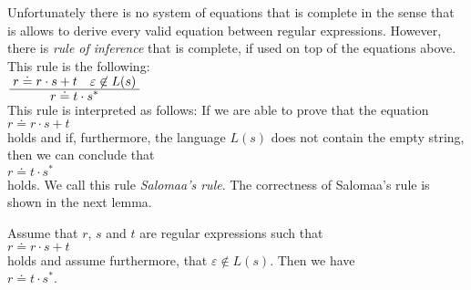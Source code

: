 Unfortunately there is no system of equations that is complete in the sense that is allows to derive
every valid equation between regular expressions.
However, there is \emph{rule of inference} that is complete, if used on top of the equations above.
This rule is the following:
\\[0.2cm]
\hspace*{1.3cm}
$\frac{\displaystyle\;r \doteq r \cdot s + t \quad \varepsilon \not\in L(s)\;}{\displaystyle r \doteq t \cdot s^*}$
\\[0.2cm]
This rule is interpreted as follows:  If we are able to prove that the equation
\\[0.2cm]
\hspace*{1.3cm}
$r \doteq r \cdot s + t$
\\[0.2cm]
holds and if, furthermore, the language $L(s)$ does not contain the empty string,
then we can conclude that
\\[0.2cm]
\hspace*{1.3cm}
$r \doteq t \cdot s^*$ 
\\[0.2cm]
holds.  We call this rule \emph{Salomaa's rule}.  The correctness of Salomaa's rule is shown in the
next lemma.


\begin{Lemma}
  Assume that $r$, $s$ and $t$ are regular expressions such that
  \\[0.2cm]
  \hspace*{1.3cm}
  $r \doteq r \cdot s + t$
  \\[0.2cm]
  holds and assume furthermore, that $\varepsilon \not\in L(s)$.  Then we have
  \\[0.2cm]
  \hspace*{1.3cm}
  $r \doteq t \cdot s^*$.
\end{Lemma}

